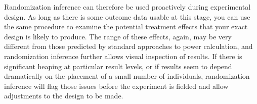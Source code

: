 Randomization inference can therefore be used proactively during experimental design.
As long as there is some outcome data usable at this stage,
you can use the same procedure to examine the potential treatment effects
that your exact design is likely to produce.
The range of these effects, again, may be very different
from those predicted by standard approaches to power calculation,
and randomization inference further allows visual inspection of results.
If there is significant heaping at particular result levels,
or if results seem to depend dramatically on the placement of a small number of individuals,
randomization inference will flag those issues before the experiment is fielded
and allow adjustments to the design to be made.
